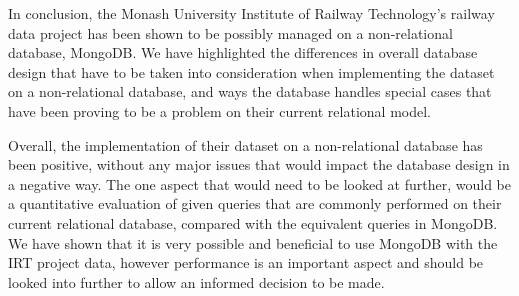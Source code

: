 \documentclass[a4paper,11pt]{article}
\begin{document}
In conclusion, the Monash University Institute of Railway Technology's railway data project has been shown to be possibly
managed on a non-relational database, MongoDB. We have highlighted the differences in overall database design that have
to be taken into consideration when implementing the dataset on a non-relational database, and ways the database
handles special cases that have been proving to be a problem on their current relational model.

Overall, the implementation of their dataset on a non-relational database has been positive, without any major issues that
would impact the database design in a negative way. The one aspect that would need to be looked at further, would be a
quantitative evaluation of given queries that are commonly performed on their current relational database, compared with
the equivalent queries in MongoDB. We have shown that it is very possible and beneficial to use MongoDB with the IRT
project data, however performance is an important aspect and should be looked into further to allow an informed decision
to be made.


\newpage                            %



\end{document}
